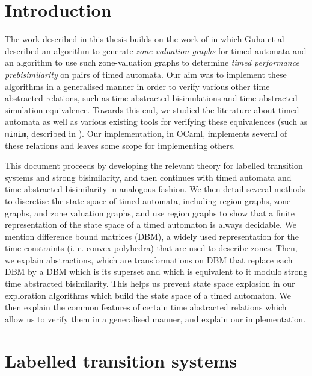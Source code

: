\documentclass[a4paper]{llncs}
\begin{document}
\tableofcontents
\pagebreak
\listoffigures
\pagebreak

\section{Introduction}

The work described in this thesis builds on the work of
\cite{DBLP:conf/cav/GuhaNA12} in which Guha et al described an
algorithm to generate \emph{zone valuation graphs} for timed automata
and an algorithm to use such zone-valuation graphs to determine
\emph{timed performance prebisimilarity} on pairs of timed
automata. Our aim was to implement these algorithms in a generalised
manner in order to verify various other time abstracted relations,
such as time abstracted bisimulations \cite{tripakis2001analysis} and
time abstracted simulation equivalence. Towards
this end, we studied the literature about timed automata as well as
various existing tools for verifying these
equivalences (such as \texttt{minim}, described in
\cite{tripakis2001analysis}). Our implementation, in OCaml, implements
several of these relations and leaves some scope for implementing
others.

This document proceeds by developing the relevant theory for labelled transition
systems and strong bisimilarity, and then continues with timed
automata and time abstracted bisimilarity in analogous fashion. We 
then detail several methods to discretise the state space of timed
automata, including region graphs, zone graphs, and zone valuation
graphs, and use region graphs to show that a finite representation of
the state space of a timed automaton is always decidable. We mention
difference bound matrices (DBM), a widely used representation for the time
constraints (i. e. convex polyhedra) that are used to describe
zones. Then, we explain abstractions, which are transformations on DBM
that replace each DBM by a DBM which is its superset and
which is equivalent to it modulo strong time abstracted
bisimilarity. This helps us prevent state space explosion in our
exploration algorithms which build the state space of a timed
automaton. We then explain the common features of certain time
abstracted relations which allow us to verify them in a generalised
manner, and explain our implementation.


\section{Labelled transition systems}
\end{document}
